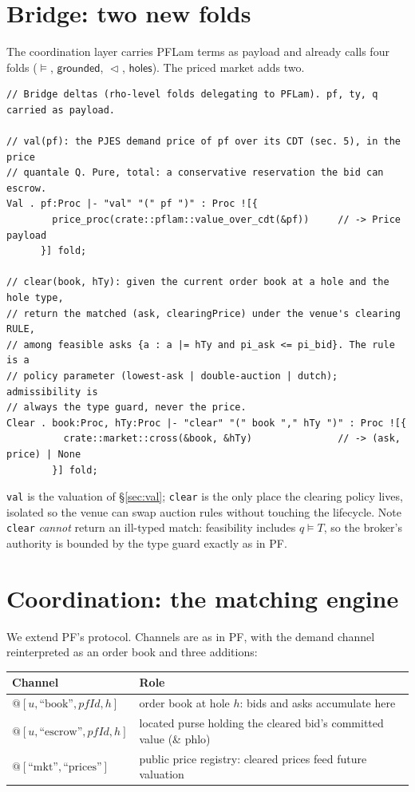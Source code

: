 \documentclass[11pt]{article}
\theoremstyle{definition}
\newcommand{\PF}{\textsf{PF}}
\newcommand{\PFLam}{\textsf{PFLam}}
\newcommand{\holes}{\textsf{holes}}
\newcommand{\grounded}{\textsf{grounded}}
\newcommand{\modelsT}{\models}
\newcommand{\plug}[3]{#1 \mathbin{\triangleleft_{#2}} #3}
\begin{document}
\section{Bridge: two new folds}\label{sec:bridge}
The coordination layer carries \PFLam{} terms as payload and already calls four folds
($\modelsT$, $\grounded$, $\plug{}{}{}$, $\holes$). The priced market adds two.

\begin{lstlisting}
// Bridge deltas (rho-level folds delegating to PFLam). pf, ty, q carried as payload.

// val(pf): the PJES demand price of pf over its CDT (sec. 5), in the price
// quantale Q. Pure, total: a conservative reservation the bid can escrow.
Val . pf:Proc |- "val" "(" pf ")" : Proc ![{
        price_proc(crate::pflam::value_over_cdt(&pf))     // -> Price payload
      }] fold;

// clear(book, hTy): given the current order book at a hole and the hole type,
// return the matched (ask, clearingPrice) under the venue's clearing RULE,
// among feasible asks {a : a |= hTy and pi_ask <= pi_bid}. The rule is a
// policy parameter (lowest-ask | double-auction | dutch); admissibility is
// always the type guard, never the price.
Clear . book:Proc, hTy:Proc |- "clear" "(" book "," hTy ")" : Proc ![{
          crate::market::cross(&book, &hTy)               // -> (ask, price) | None
        }] fold;
\end{lstlisting}

\noindent \texttt{val} is the valuation of \S\ref{sec:val}; \texttt{clear} is the only place the
clearing policy lives, isolated so the venue can swap auction rules without touching the lifecycle.
Note \texttt{clear} \emph{cannot} return an ill-typed match: feasibility includes $q \modelsT T$, so
the broker's authority is bounded by the type guard exactly as in \PF{}.

\section{Coordination: the matching engine}\label{sec:coord}
We extend \PF{}'s protocol. Channels are as in \PF{}, with the demand channel reinterpreted as an
order book and three additions:
\begin{center}\small
\begin{tabular}{@{}ll@{}}
\toprule
Channel & Role \\
\midrule
$@[u,\text{``book''},pfId,h]$ & order book at hole $h$: bids and asks accumulate here \\
$@[u,\text{``escrow''},pfId,h]$ & located purse holding the cleared bid's committed value (\& phlo) \\
$@[\text{``mkt''},\text{``prices''}]$ & public price registry: cleared prices feed future valuation \\
\bottomrule
\end{tabular}
\end{center}
\end{document}
